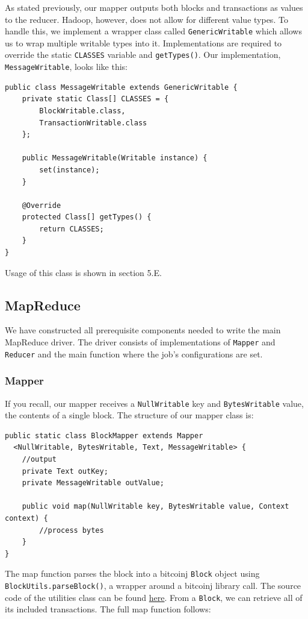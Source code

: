 \documentclass[9pt,twocolumn,twoside]{idsi}
\begin{document}
As stated previously, our mapper outputs both blocks and transactions as values to the reducer. Hadoop, however, does not allow for different value types. To handle this, we implement a wrapper class called \lstinline{GenericWritable} which allows us to wrap multiple writable types into it. Implementations are required to override the static \lstinline{CLASSES} variable and \lstinline{getTypes()}. Our implementation, \lstinline{MessageWritable}, looks like this:

\begin{lstlisting}
public class MessageWritable extends GenericWritable {
    private static Class[] CLASSES = {
        BlockWritable.class,
        TransactionWritable.class
    };

    public MessageWritable(Writable instance) {
        set(instance);
    }

    @Override
    protected Class[] getTypes() {
        return CLASSES;
    }
}
\end{lstlisting}

Usage of this class is shown in section 5.E.

\subsection{MapReduce}
We have constructed all prerequisite components needed to write the main MapReduce driver. The driver consists of implementations of \lstinline{Mapper} and \lstinline{Reducer} and the main function where the job's configurations are set.

\subsubsection{Mapper}
If you recall, our mapper receives a \lstinline{NullWritable} key and \lstinline{BytesWritable} value, the contents of a single block. The structure of our mapper class is:
\begin{lstlisting}
public static class BlockMapper extends Mapper
  <NullWritable, BytesWritable, Text, MessageWritable> {
    //output
    private Text outKey;
    private MessageWritable outValue;

    public void map(NullWritable key, BytesWritable value, Context context) {
        //process bytes
    }
}
\end{lstlisting}
The map function parses the block into a bitcoinj \lstinline{Block} object using \lstinline{BlockUtils.parseBlock()}, a wrapper around a bitcoinj library call. The source code of the utilities class can be found \href{https://github.com/nishilshah17/idsi_bitcoin/blob/97859e4f8284f2fc5c1db488d61d075af9ea256d/reduce_blockchain/blockparser/BlockUtils.java}{here}. From a \lstinline{Block}, we can retrieve all of its included transactions. The full map function follows:
\end{document}
